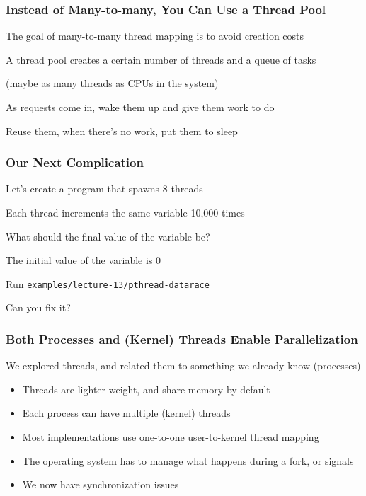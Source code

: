   \begin{frame}
    \frametitle{Instead of Many-to-many, You Can Use a Thread Pool}

    The goal of many-to-many thread mapping is to avoid creation costs

    \vspace{2em}

    A thread pool creates a certain number of threads and a queue of tasks

    \hspace{2em} (maybe as many threads as CPUs in the system)

    \vspace{2em}

    As requests come in, wake them up and give them work to do

    \vspace{2em}

    Reuse them, when there's no work, put them to sleep
  \end{frame}

  \begin{frame}
    \frametitle{Our Next Complication}

    Let's create a program that spawns 8 threads

    \hspace{2em} Each thread increments the same variable 10,000 times

    \vspace{2em}

    What should the final value of the variable be?

    \hspace{2em} The initial value of the variable is 0

    \vspace{2em}

    Run \texttt{examples/lecture-13/pthread-datarace}

    \hspace{2em} Can you fix it?
  \end{frame}

  \begin{frame}
    \frametitle{Both Processes and (Kernel) Threads Enable Parallelization}

    We explored threads, and related them to something we already know (processes)
    \begin{itemize}
      \item Threads are lighter weight, and share memory by default
      \item Each process can have multiple (kernel) threads
      \item Most implementations use one-to-one user-to-kernel thread mapping
      \item The operating system has to manage what happens during a fork, or signals
      \item We now have synchronization issues
    \end{itemize}
  \end{frame}

